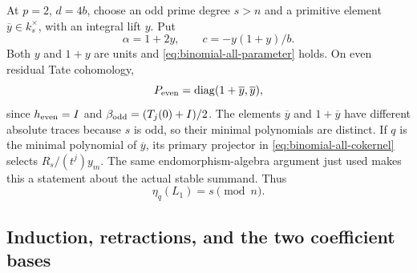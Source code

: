 At $p=2$, $d=4b$, choose an odd prime degree $s>n$ and
a primitive element $\overline y\in k_s^\times$, with
an integral lift $y$.  Put
\[
 \alpha=1+2y,\qquad c=-y(1+y)/b.
\]
Both $y$ and $1+y$ are units and
\eqref{eq:binomial-all-parameter} holds.
On even residual Tate cohomology,
\[
 P_{\rm even}=\operatorname{diag}(1+\overline y,\overline y),
\]
since $h_{\rm even}=I$ and
$\beta_{\rm odd}=(T_j(0)+I)/2$.
The elements $\overline y$ and $1+\overline y$ have
different absolute traces because $s$ is odd, so their
minimal polynomials are distinct.
If $q$ is the minimal polynomial of $\overline y$,
its primary projector in \eqref{eq:binomial-all-cokernel}
selects $R_s/(t^j)y_m$.
The same endomorphism-algebra argument just used makes
this a statement about the actual stable summand.
Thus
\begin{equation}\label{eq:binomial-all-two-value}
 \eta_q(L_1)=s\pmod n.
\end{equation}

\subsection{Induction, retractions, and the two coefficient bases}


